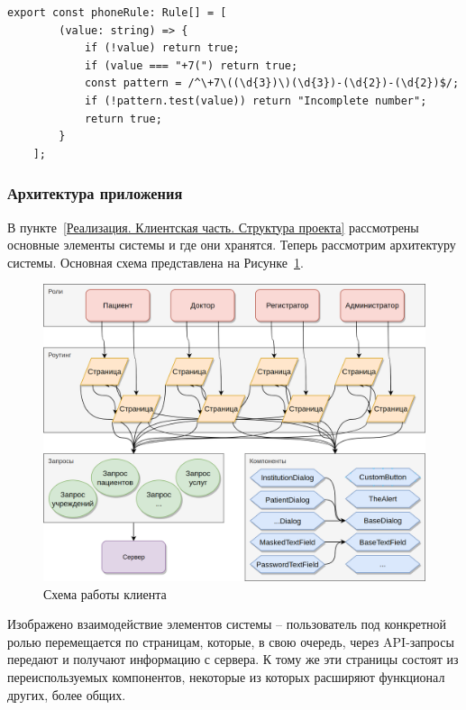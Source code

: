 \documentclass[a4paper,article]{article}
\begin{document}
\begin{sloppypar}
    \begin{lstlisting}[label=phonerule,caption=Пример проверки корректности телефона]
    export const phoneRule: Rule[] = [
        (value: string) => {
            if (!value) return true;
            if (value === "+7(") return true;
            const pattern = /^\+7\((\d{3})\)(\d{3})-(\d{2})-(\d{2})$/;
            if (!pattern.test(value)) return "Incomplete number";
            return true;
        }
    ];
    \end{lstlisting}

    \subsubsection{Архитектура приложения}\label{Реализация. Клиентская часть. Архитектура слоёв}

    В пункте~\ref{Реализация. Клиентская часть. Структура проекта} рассмотрены основные элементы системы и где они хранятся. Теперь рассмотрим архитектуру системы. Основная схема представлена на Рисунке~\ref{fig:Схема работы клиента}.

    \begin{figure}[h]

        \centering

        \includegraphics[width=0.9\linewidth]{Схема работы клиента.png}

        \caption{\centering Схема работы клиента}

        \label{fig:Схема работы клиента}

    \end{figure}

    Изображено взаимодействие элементов системы -- пользователь под конкретной ролью перемещается по страницам, которые, в свою очередь, через API-запросы передают и получают информацию с сервера. К тому же эти страницы состоят из переиспользуемых компонентов, некоторые из которых расширяют функционал других, более общих.


\end{sloppypar}
\end{document}
